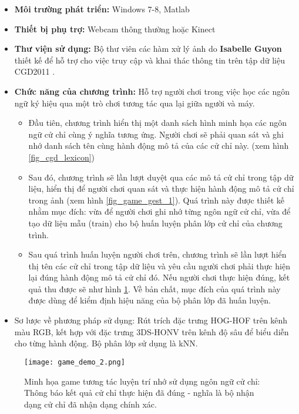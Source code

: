 \begin{itemize}
	\item \textbf{Môi trường phát triển: } Windows 7-8, Matlab
	\item \textbf{Thiết bị phụ trợ:} Webcam thông thường hoặc Kinect
	\item \textbf{Thư viện sử dụng: } Bộ thư viên các hàm xử lý ảnh do \textbf{Isabelle Guyon} thiết kế để hỗ trợ cho việc truy cập và khai thác thông tin trên tập dữ liệu CGD2011 \cite{Isabelle_Chalearn}.
	\item \textbf{Chức năng của chương trình: } Hỗ trợ người chơi trong việc học các ngôn ngữ ký hiệu qua một trò chơi tương tác qua lại giữa người và máy. 
		\begin{itemize}
			\item Đầu tiên, chương trình hiển thị một danh sách hình minh họa các ngôn ngữ cử chỉ cùng ý nghĩa tương ứng. Người chơi sẽ phải quan sát và ghi nhớ danh sách tên cùng hành động mô tả của các cử chỉ này. (xem hình \ref{fig_cgd_lexicon})
			\item Sau đó, chương trình sẽ lần lượt duyệt qua các mô tả cử chỉ trong tập dữ liệu, hiển thị để người chơi quan sát và thực hiện hành động mô tả cử chỉ trong ảnh (xem hình \ref{fig_game_gest_1}). Quá trình này được thiết kế nhằm mục đích: vừa để người chơi ghi nhớ từng ngôn ngữ cử chỉ, vừa để tạo dữ liệu mẫu (train) cho bộ huấn luyện phân lớp cử chỉ của chương trình.
			\item Sau quá trình huấn luyện người chơi trên, chương trình sẽ lần lượt hiển thị tên các cử chỉ trong tập dữ liệu và yêu cầu người chơi phải thực hiện lại đúng hành động mô tả cử chỉ đó. Nếu người chơi thực hiện đúng, kết quả thu được sẽ như hình \ref{fig_game_gest_2}. Về bản chất, mục đích của quá trình này được dùng để kiểm định hiệu năng của bộ phân lớp đã huấn luyện.
		\end{itemize}
	\item Sơ lược về phương pháp sử dụng: Rút trích đặc trưng HOG-HOF trên kênh màu RGB, kết hợp với đặc trưng 3DS-HONV trên kênh độ sâu để biểu diễn cho từng hành động. Bộ phân lớp sử dụng là kNN.
\end{itemize}

\begin{figure}
\centering
\texttt{[image: game\_demo\_2.png]}
\caption{Minh họa game tương tác luyện trí nhớ sử dụng ngôn ngữ cử chỉ: Thông báo kết quả cử chỉ thực hiện đã đúng - nghĩa là bộ nhận dạng cử chỉ đã nhận dạng chính xác.}
\label{fig_game_gest_2}
\end{figure}



